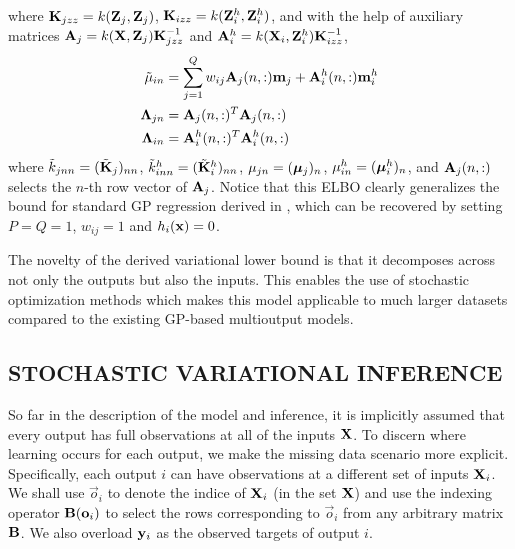 where $\mathbf{K}_{jzz} = k(\mathbf{Z}_j, \mathbf{Z}_j)$, $\mathbf{K}_{izz} = k(\mathbf{Z}^h_i, \mathbf{Z}^h_i)$, and with the help of auxiliary matrices $\mathbf{A}_j = k(\mathbf{X},\mathbf{Z}_j) \mathbf{K}_{jzz}^{-1}$ and $\mathbf{A}^h_i = k(\mathbf{X}_i,\mathbf{Z}^h_i)\mathbf{K}_{izz}^{-1}$, 
\begin{align}
\tilde{\mu}_{in}
&= \sum_{j=1}^Q w_{ij} \mathbf{A}_j(n,:) \mathbf{m}_j + \mathbf{A}^h_i(n,:) \mathbf{m}^h_i \\
\mathbf{\Lambda}_{jn}
&= \mathbf{A}_j(n,:)^T \mathbf{A}_j(n,:)  \\
\mathbf{\Lambda}_{in}
&= \mathbf{A}^h_i(n,:)^T \mathbf{A}^h_i(n,:) 
\end{align}
where $\tilde{k}_{jnn} = (\tilde{\mathbf{K}}_j)_{nn}$, $\tilde{k}^h_{inn} = (\tilde{\mathbf{K}}^h_i)_{nn}$, $\mu_{jn} = (\boldsymbol{\mu}_j)_n$,  $\mu^h_{in} = (\boldsymbol{\mu}^h_i)_n$, and $\mathbf{A}_j(n,:)$ selects the $n$-th row vector of $\mathbf{A}_j$. 
Notice that this ELBO clearly generalizes the bound for standard GP regression derived in \citep{hensmangaussian}, which can be recovered by setting $P = Q = 1$, $w_{ij} = 1$ and $h_i(\mathbf{x}) = 0$.

The novelty of the derived variational lower bound is that it decomposes across not only the outputs but also the inputs.
This enables the use of stochastic optimization methods which makes this model applicable to much larger datasets compared to the existing GP-based multioutput models. 

\subsection{STOCHASTIC VARIATIONAL INFERENCE}
\newcommand{\oi}{\vec{o}_i}

So far in the description of the model and inference, it is implicitly assumed that every output has full observations at all of the inputs $\mathbf{X}$.
To discern where learning occurs for each output, we make the missing data scenario more explicit.
Specifically, each output $i$ can have observations at a different set of inputs $\mathbf{X}_i$. 
We shall use $\oi$ to denote the indice of $\mathbf{X}_i$ (in the set $\mathbf{X}$) and use the indexing operator $\B(\oi)$ to select the rows corresponding to $\oi$ from any arbitrary matrix $\mathbf{B}$.
We also overload $\mathbf{y}_i$ as the observed targets of output $i$. 

